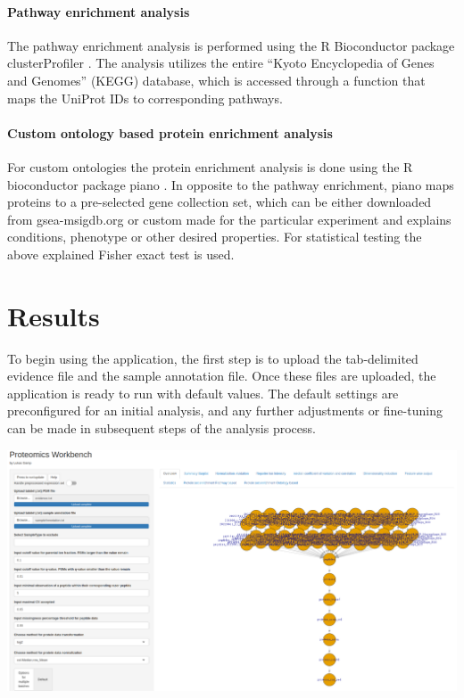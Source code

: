 \documentclass[
  11pt,
]{article}
\let\origfigure\figure
\begin{document}
\hypertarget{pathway-enrichment-analysis}{%
\paragraph{Pathway enrichment
analysis}\label{pathway-enrichment-analysis}}

The pathway enrichment analysis is performed using the R Bioconductor
package clusterProfiler \citep{Wu2021}. The analysis utilizes the entire
``Kyoto Encyclopedia of Genes and Genomes'' (KEGG) database, which is
accessed through a function that maps the UniProt IDs to corresponding
pathways.

\hypertarget{custom-ontology-based-protein-enrichment-analysis}{%
\paragraph{Custom ontology based protein enrichment
analysis}\label{custom-ontology-based-protein-enrichment-analysis}}

For custom ontologies the protein enrichment analysis is done using the
R bioconductor package piano \citep{Vaeremo2013}. In opposite to the
pathway enrichment, piano maps proteins to a pre-selected gene
collection set, which can be either downloaded from gsea-msigdb.org or
custom made for the particular experiment and explains conditions,
phenotype or other desired properties. For statistical testing the above
explained Fisher exact test is used.

\newpage

\hypertarget{results}{%
\section{Results}\label{results}}

To begin using the application, the first step is to upload the
tab-delimited evidence file and the sample annotation file. Once these
files are uploaded, the application is ready to run with default values.
The default settings are preconfigured for an initial analysis, and any
further adjustments or fine-tuning can be made in subsequent steps of
the analysis process.

\bgroup  \origfigure[H] 

{\centering \includegraphics[width=1\linewidth]{screenshots/overview} 

}
\end{document}
